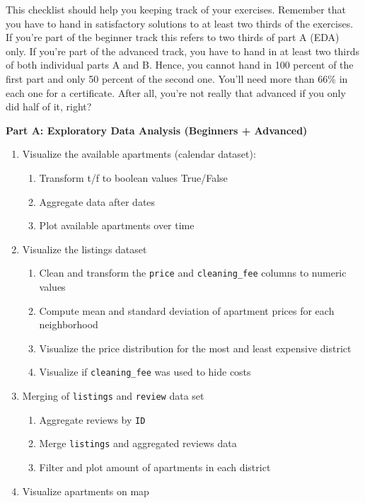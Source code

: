 \documentclass[
  11pt,
]{book}
\begin{document}
This checklist should help you keeping track of your exercises. Remember
that you have to hand in satisfactory solutions to at least two thirds
of the exercises. If you're part of the beginner track this refers to
two thirds of part A (EDA) only. If you're part of the advanced track,
you have to hand in at least two thirds of both individual parts A and
B. Hence, you cannot hand in 100 percent of the first part and only 50
percent of the second one. You'll need more than 66\% in each one for a
certificate. After all, you're not really that advanced if you only did
half of it, right?

\textbf{Part A: Exploratory Data Analysis (Beginners + Advanced)}

\begin{enumerate}
\def\labelenumi{\arabic{enumi}.}
\item
  Visualize the available apartments (calendar dataset):

  \begin{enumerate}
  \def\labelenumii{\alph{enumii}.}
  \item
    Transform t/f to boolean values True/False
  \item
    Aggregate data after dates
  \item
    Plot available apartments over time
  \end{enumerate}
\item
  Visualize the listings dataset

  \begin{enumerate}
  \def\labelenumii{\alph{enumii}.}
  \item
    Clean and transform the \texttt{price} and \texttt{cleaning\_fee}
    columns to numeric values
  \item
    Compute mean and standard deviation of apartment prices for each
    neighborhood
  \item
    Visualize the price distribution for the most and least expensive
    district
  \item
    Visualize if \texttt{cleaning\_fee} was used to hide costs
  \end{enumerate}
\item
  Merging of \texttt{listings} and \texttt{review} data set

  \begin{enumerate}
  \def\labelenumii{\alph{enumii}.}
  \item
    Aggregate reviews by \texttt{ID}
  \item
    Merge \texttt{listings} and aggregated reviews data
  \item
    Filter and plot amount of apartments in each district
  \end{enumerate}
\item
  Visualize apartments on map


\end{enumerate}
\end{document}
